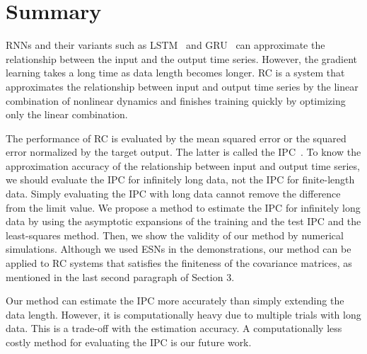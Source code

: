 \documentclass{article}
\begin{document}
\section{Summary}
\begin{comment}
・RC の説明と長所と短所の説明。
・性能指標としての IPC と既存の推定法の紹介。
・既存手法の問題点を漸近形で解決。
・計算の重さは今後の課題。
\end{comment}
RNNs and their variants such as LSTM~\cite{hochreiter1997long} and GRU~\cite{cho2014learning} can approximate the relationship between the input and the output time series. 
However, the gradient learning takes a long time as data length becomes longer. 
RC is a system that approximates the relationship between input and output time series by the linear combination of nonlinear dynamics and finishes training quickly by optimizing only the linear combination. 

The performance of RC is evaluated by the mean squared error or the squared error normalized by the target output. 
The latter is called the IPC~\cite{dambre2012information, kubota2021unifying}. 
To know the approximation accuracy of the relationship between input and output time series, we should evaluate the IPC for infinitely long data, not the IPC for finite-length data. 
Simply evaluating the IPC with long data cannot remove the difference from the limit value. 
We propose a method to estimate the IPC for infinitely long data by using the asymptotic expansions of the training and the test IPC and the least-squares method. 
Then, we show the validity of our method by numerical simulations. 
Although we used ESNs in the demonstrations, our method can be applied to RC systems that satisfies the finiteness of the covariance matrices, as mentioned in the last second paragraph of Section 3. 

Our method can estimate the IPC more accurately than simply extending the data length. 
However, it is computationally heavy due to multiple trials with long data. 
This is a trade-off with the estimation accuracy. 
A computationally less costly method for evaluating the IPC is our future work. 
\end{document}
